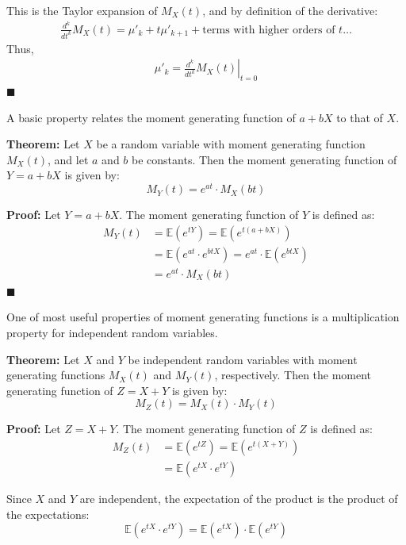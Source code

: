 \documentclass[twoside]{book}
\begin{document}
This is the Taylor expansion of \( M_X(t) \), and by definition of the derivative:
\begin{align*}
    \frac{d^k}{dt^k} M_X(t) = \mu'_k + t\mu'_{k+1} + \text{terms with higher orders of }t \dots
\end{align*}
Thus,
\begin{align*}
    \mu'_k = \left. \frac{d^k}{dt^k} M_X(t) \right|_{t=0}
\end{align*}
\hfill\(\blacksquare\)

A basic property relates the moment generating function of $ a + bX $ to that of $ X $.
\begin{textbox}
\textbf{Theorem:} Let $X$ be a random variable with moment generating function $M_X(t)$, and let $a$ and $b$ be constants. Then the moment generating function of $Y = a + bX$ is given by:
\[
M_Y(t) = e^{at} \cdot M_X(bt)
\]
\end{textbox}

\textbf{Proof:} Let $Y = a + bX$. The moment generating function of $Y$ is defined as:
\begin{align*}
M_Y(t) &= \mathbb{E}\left( e^{tY}\right) = \mathbb{E}\left( e^{t(a + bX)}\right) \\
&=\mathbb{E}\left( e^{at}\cdot e^{btX}\right) =e^{at}\cdot\mathbb{E}\left(  e^{btX}\right)  \\
&= e^{at}\cdot M_X(bt)
\end{align*}
\hfill $\blacksquare$

One of most useful properties of moment generating functions is a multiplication property for independent random variables.
\begin{textbox}
\textbf{Theorem:} Let $X$ and $Y$ be independent random variables with moment generating functions $M_X(t)$ and $M_Y(t)$, respectively. Then the moment generating function of $Z = X + Y$ is given by:
\[
M_Z(t) = M_X(t) \cdot M_Y(t)
\]
\end{textbox}

\textbf{Proof:} Let $Z = X + Y$. The moment generating function of $Z$ is defined as:
\begin{align*}
M_Z(t) &= \mathbb{E}\left( e^{tZ} \right) = \mathbb{E}\left( e^{t(X + Y)} \right) \\
&= \mathbb{E}\left( e^{tX} \cdot e^{tY} \right)
\end{align*}

Since $X$ and $Y$ are independent, the expectation of the product is the product of the expectations:
\[
\mathbb{E}\left( e^{tX} \cdot e^{tY} \right) = \mathbb{E}\left( e^{tX} \right) \cdot \mathbb{E}\left( e^{tY} \right)
\]
\end{document}

